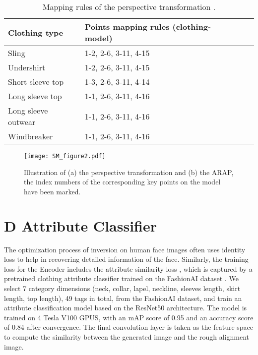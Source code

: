 \documentclass[10pt,twocolumn,letterpaper]{article}
\begin{document}
\begin{table}[h]
    \caption{Mapping rules of the perspective transformation .}
    \label{tab:mapping_rule}
    \centering
    \begin{tabular}{llll}
        \toprule
        Clothing type & Points mapping rules (clothing-model) \\ 
         \midrule
        Sling & 1-2, 2-6, 3-11, 4-15  \\ 
        Undershirt & 1-2, 2-6, 3-11, 4-15  \\ 
        Short sleeve top & 1-3, 2-6, 3-11, 4-14  \\ 
        Long sleeve top & 1-1, 2-6, 3-11, 4-16  \\ 
        Long sleeve outwear & 1-1, 2-6, 3-11, 4-16  \\
        Windbreaker & 1-1, 2-6, 3-11, 4-16  \\ 
        \bottomrule
    \end{tabular}
\end{table}


\begin{figure}[h]
  \centering
  \texttt{[image: SM\_figure2.pdf]}
  \caption{Illustration of (a) the perspective transformation and (b) the ARAP, the index numbers of the corresponding key points on the model have been marked.}\label{fig: SM_rough_alignment}
\end{figure}


\section*{D Attribute Classifier}
The optimization process of inversion on human face images often uses identity loss to help in recovering detailed information of the face. Similarly, the training loss for the Encoder includes the attribute similarity loss , which is captured by a pretrained clothing attribute classifier  trained on the FashionAI dataset \cite{zou2019fashionai}. We select 7 category dimensions (neck, collar, lapel, neckline, sleeves length, skirt length, top length), 49 tags in total, from the FashionAI dataset, and train an attribute classification model based on the ResNet50 architecture. The model is trained on 4 Tesla V100 GPUS, with an mAP score of 0.95 and an accuracy score of 0.84 after convergence. 
The final convolution layer is taken as the feature space to compute the similarity between the generated image and the rough alignment image.
\end{document}
